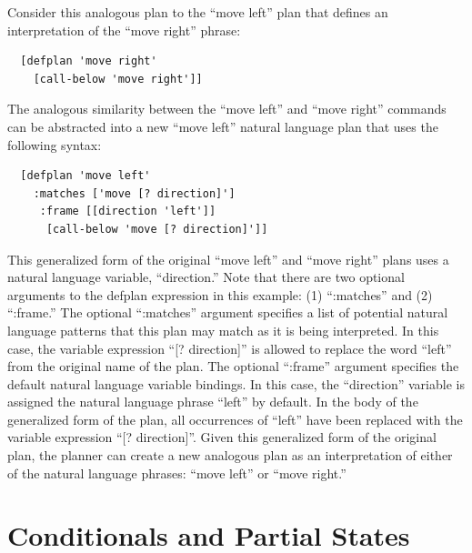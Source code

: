 Consider this analogous plan to the ``move left'' plan that defines an
interpretation of the ``move right'' phrase:
\begin{samepage}
\begin{Verbatim}
  [defplan 'move right'
    [call-below 'move right']]
\end{Verbatim}
\end{samepage}
The analogous similarity between the ``move left'' and ``move right''
commands can be abstracted into a new ``move left'' natural language
plan that uses the following syntax:
\begin{samepage}
\begin{Verbatim}
  [defplan 'move left'
    :matches ['move [? direction]']
     :frame [[direction 'left']]
      [call-below 'move [? direction]']]
\end{Verbatim}
\end{samepage}
This generalized form of the original ``move left'' and ``move right''
plans uses a natural language variable, ``direction.''  Note that
there are two optional arguments to the defplan expression in this
example: (1) ``:matches'' and (2) ``:frame.''  The optional
``:matches'' argument specifies a list of potential natural language
patterns that this plan may match as it is being interpreted.  In this
case, the variable expression ``[? direction]'' is allowed to replace
the word ``left'' from the original name of the plan.  The optional
``:frame'' argument specifies the default natural language variable
bindings.  In this case, the ``direction'' variable is assigned the
natural language phrase ``left'' by default.  In the body of the
generalized form of the plan, all occurrences of ``left'' have been
replaced with the variable expression ``[? direction]''.  Given this
generalized form of the original plan, the planner can create a new
analogous plan as an interpretation of either of the natural language
phrases: ``move left'' or ``move right.''

\section{Conditionals and Partial States}

